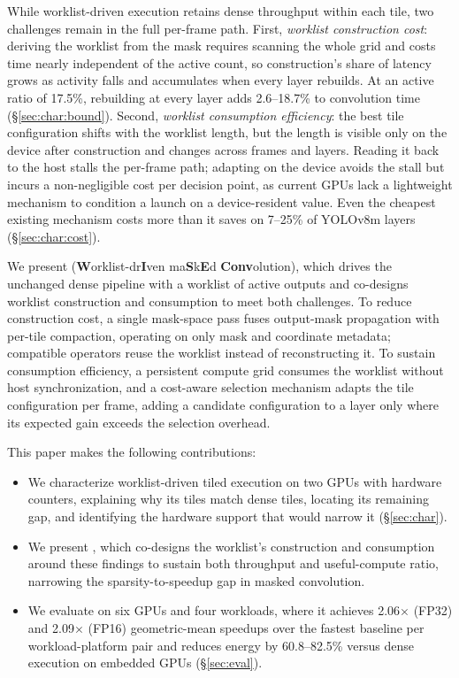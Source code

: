 While worklist-driven execution retains dense throughput within each tile,
two challenges remain in the full per-frame path.
First, \emph{worklist construction cost}: deriving the worklist from the
mask requires scanning the whole grid and costs time nearly independent of
the active count, so construction's share of latency grows as activity falls
and accumulates when every layer rebuilds. At an active ratio of 17.5\%,
rebuilding at every layer adds 2.6--18.7\% to
convolution time (\S\ref{sec:char:bound}).
Second, \emph{worklist consumption efficiency}: the best tile configuration
shifts with the worklist length, but
the length is visible only on the device after construction and
changes across frames and layers. Reading it back to the host stalls the
per-frame path; adapting on the device avoids the stall but incurs a
non-negligible cost per decision point, as current GPUs lack a lightweight
mechanism to condition a launch on a device-resident value. Even the cheapest
existing mechanism costs more than it saves on 7--25\% of YOLOv8m layers (\S\ref{sec:char:cost}).

We present \sysname
(\textbf{W}orklist-dr\textbf{I}ven ma\textbf{S}k\textbf{E}d
\textbf{Conv}o\-lu\-tion), which drives the unchanged dense pipeline with
a worklist of active outputs and co-designs worklist construction and
consumption to meet both challenges.
To reduce construction cost, a single mask-space pass fuses output-mask
propagation with per-tile compaction, operating on only mask and coordinate
metadata; compatible operators reuse the worklist instead of
reconstructing it.
To sustain consumption efficiency, a persistent compute grid consumes the
worklist without host synchronization, and a cost-aware selection mechanism
adapts the tile configuration per frame, adding a candidate configuration to a layer only
where its expected gain exceeds the selection overhead.

This paper makes the following contributions:
\begin{itemize}
  \item We characterize worklist-driven tiled execution on two GPUs with
        hardware counters, explaining why its tiles match dense tiles,
        locating its remaining gap, and identifying the hardware support that
        would narrow it (\S\ref{sec:char}).

  \item We present \sysname, which co-designs the worklist's construction and consumption around these findings to sustain both throughput and useful-compute ratio,
        narrowing the sparsity-to-speedup gap in masked convolution.

  \item We evaluate \sysname on six GPUs and four workloads, where it
        achieves 2.06$\times$ (FP32) and 2.09$\times$ (FP16) geometric-mean
        speedups over the fastest baseline per workload-platform pair and
        reduces energy by 60.8--82.5\% versus dense
        execution on embedded GPUs (\S\ref{sec:eval}).
\end{itemize}


